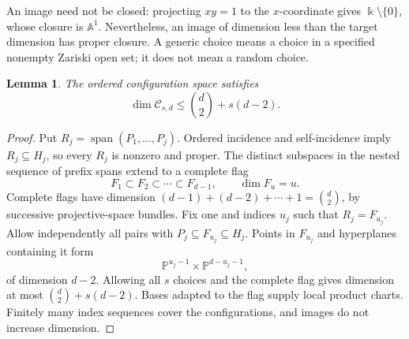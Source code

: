 \documentclass[11pt,a4paper]{article}
\newcommand{\A}{\mathbb A}
\newcommand{\PP}{\mathbb P}
\newcommand{\Ccal}{\mathcal C}
\DeclareMathOperator{\spanop}{span}
\newtheorem{lemma}[theorem]{Lemma}
\theoremstyle{definition}
\theoremstyle{remark}
\numberwithin{equation}{section}
\begin{document}
An image need not be closed: projecting $xy=1$ to the $x$-coordinate gives $\Bbbk\setminus\{0\}$, whose closure is $\A^1$. Nevertheless, an image of dimension less than the target dimension has proper closure. A generic choice means a choice in a specified nonempty Zariski open set; it does not mean a random choice.

\begin{lemma}\label{lem:complete-flag-bound}
The ordered configuration space satisfies
\[
\dim\Ccal_{s,d}\le\binom d2+s(d-2).
\]
\end{lemma}

\begin{proof}
Put $R_j=\spanop(P_1,\ldots,P_j)$. Ordered incidence and self-incidence imply $R_j\subseteq H_j$, so every $R_j$ is nonzero and proper. The distinct subspaces in the nested sequence of prefix spans extend to a complete flag
\[
F_1\subset F_2\subset\cdots\subset F_{d-1},\qquad\dim F_u=u.
\]
Complete flags have dimension $(d-1)+(d-2)+\cdots+1=\binom d2$, by successive projective-space bundles. Fix one and indices $u_j$ such that $R_j=F_{u_j}$. Allow independently all pairs with $P_j\subseteq F_{u_j}\subseteq H_j$. Points in $F_{u_j}$ and hyperplanes containing it form
\[
\PP^{u_j-1}\times\PP^{d-u_j-1},
\]
of dimension $d-2$. Allowing all $s$ choices and the complete flag gives dimension at most $\binom d2+s(d-2)$. Bases adapted to the flag supply local product charts. Finitely many index sequences cover the configurations, and images do not increase dimension.
\end{proof}
\end{document}
